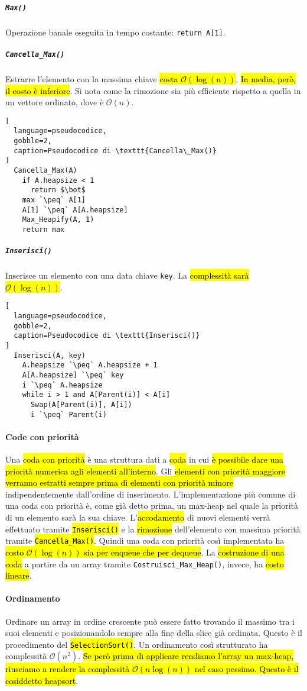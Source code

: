 \documentclass[a4paper,11pt,twoside]{article}
\theoremstyle{plain}
\theoremstyle{definition}
\theoremstyle{remark}
\newcommand{\peq}{$\gets$}
\begin{document}
\subparagraph{\texttt{Max()}} Operazione banale eseguita in tempo costante:
\texttt{return A[1]}.

\subparagraph{\texttt{Cancella\_Max()}} Estrarre l'elemento con la massima
chiave \hl{costa $\mathcal{O}(\log(n))$}. \hl{In media, però, il costo è
inferiore}. Si nota come la rimozione sia più efficiente rispetto a quella in un
vettore ordinato, dove è $\mathcal{O}(n)$.

\begin{lstlisting}[
  language=pseudocodice,
  gobble=2,
  caption=Pseudocodice di \texttt{Cancella\_Max()}
]
  Cancella_Max(A)
    if A.heapsize < 1
      return $\bot$
    max `\peq` A[1]
    A[1] `\peq` A[A.heapsize]
    Max_Heapify(A, 1)
    return max
\end{lstlisting}

\subparagraph{\texttt{Inserisci()}} Inserisce un elemento con una data chiave
\texttt{key}. La \hl{complessità sarà $\mathcal{O}(\log(n))$}.

\begin{lstlisting}[
  language=pseudocodice,
  gobble=2,
  caption=Pseudocodice di \texttt{Inserisci()}
]
  Inserisci(A, key)
    A.heapsize `\peq` A.heapsize + 1
    A[A.heapsize] `\peq` key
    i `\peq` A.heapsize
    while i > 1 and A[Parent(i)] < A[i]
      Swap(A[Parent(i)], A[i])
      i `\peq` Parent(i)
\end{lstlisting}

\paragraph{Code con priorità} Una \hl{coda con priorità} è una struttura dati a
\hl{coda} in cui \hl{è possibile dare una priorità numerica agli elementi
all'interno}. Gli \hl{elementi con priorità maggiore verranno estratti sempre
prima di elementi con priorità minore} indipendentemente dall'ordine di
inserimento. L'implementazione più comune di una coda con priorità è, come già
detto prima, un max-heap nel quale la priorità di un elemento sarà la sua
chiave. L'\hl{accodamento} di nuovi elementi verrà effettuato tramite
\hl{\texttt{Inserisci()}} e la \hl{rimozione} dell'elemento con massima priorità
tramite \hl{\texttt{Cancella\_Max()}}. Quindi una coda con priorità così
implementata ha \hl{costo $\mathcal{O}(\log(n))$ sia per enqueue che per
dequeue}. La \hl{costruzione di una coda} a partire da un array tramite
\texttt{Costruisci\_Max\_Heap()}, invece, ha \hl{costo lineare}.

\paragraph{Ordinamento} Ordinare un array in ordine crescente può essere fatto
trovando il massimo tra i suoi elementi e posizionandolo sempre alla fine della
slice già ordinata. Questo è il procedimento del \hl{\texttt{SelectionSort()}}.
Un ordinamento così strutturato ha complessità $\mathcal{O}(n^2)$. \hl{Se però
prima di applicare rendiamo l'array un max-heap, riusciamo a rendere la
complessità $\mathcal{O}(n\log(n))$ nel caso pessimo. Questo è il cosiddetto
heapsort}.
\end{document}
